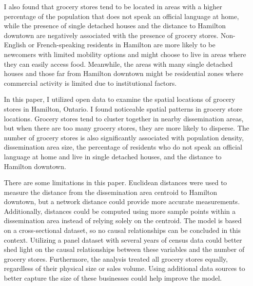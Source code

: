 \documentclass[preprint, 3p,
authoryear]{elsarticle} %
\begin{document}
I also found that grocery stores tend to be located in areas with a
higher percentage of the population that does not speak an official
language at home, while the presence of single detached houses and the
distance to Hamilton downtown are negatively associated with the
presence of grocery stores. Non-English or French-speaking residents in
Hamilton are more likely to be newcomers with limited mobility options
and might choose to live in areas where they can easily access food.
Meanwhile, the areas with many single detached houses and those far from
Hamilton downtown might be residential zones where commercial activity
is limited due to institutional factors.

In this paper, I utilized open data to examine the spatial locations of
grocery stores in Hamilton, Ontario. I found noticeable spatial patterns
in grocery store locations. Grocery stores tend to cluster together in
nearby dissemination areas, but when there are too many grocery stores,
they are more likely to disperse. The number of grocery stores is also
significantly associated with population density, dissemination area
size, the percentage of residents who do not speak an official language
at home and live in single detached houses, and the distance to Hamilton
downtown.

There are some limitations in this paper. Euclidean distances were used
to measure the distance from the dissemination area centroid to Hamilton
downtown, but a network distance could provide more accurate
measurements. Additionally, distances could be computed using more
sample points within a dissemination area instead of relying solely on
the centroid. The model is based on a cross-sectional dataset, so no
causal relationships can be concluded in this context. Utilizing a panel
dataset with several years of census data could better shed light on the
causal relationships between these variables and the number of grocery
stores. Furthermore, the analysis treated all grocery stores equally,
regardless of their physical size or sales volume. Using additional data
sources to better capture the size of these businesses could help
improve the model.

\pagebreak

\renewcommand\refname{References}

\end{document}
